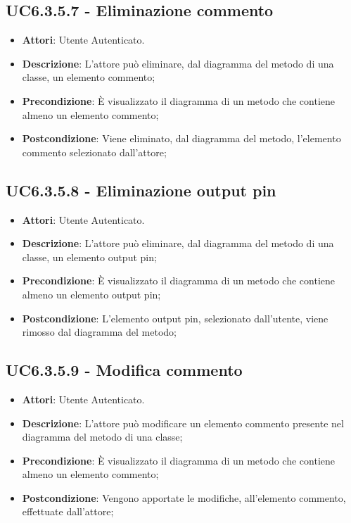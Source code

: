 \subsection{UC6.3.5.7 - Eliminazione commento} 
\label{ssec:UC6.3.5.7} 
\begin{itemize} 
\item \textbf{Attori}: Utente Autenticato.
\item \textbf{Descrizione}: L'attore può eliminare, dal diagramma del metodo di una classe, un elemento commento;
\item \textbf{Precondizione}: È visualizzato il diagramma di un metodo che contiene almeno un elemento commento;
\item \textbf{Postcondizione}: Viene eliminato, dal diagramma del metodo,  l'elemento commento selezionato dall'attore;
\end{itemize} 
\subsection{UC6.3.5.8 - Eliminazione output pin} 
\label{ssec:UC6.3.5.8} 
\begin{itemize} 
\item \textbf{Attori}: Utente Autenticato.
\item \textbf{Descrizione}: L'attore può eliminare, dal diagramma del metodo di una classe, un elemento output pin;
\item \textbf{Precondizione}: È visualizzato il diagramma di un metodo che contiene almeno un elemento output pin;
\item \textbf{Postcondizione}: L'elemento output pin, selezionato dall'utente, viene rimosso dal diagramma del metodo;
\end{itemize} 
\subsection{UC6.3.5.9 - Modifica commento} 
\label{ssec:UC6.3.5.9} 
\begin{itemize} 
\item \textbf{Attori}: Utente Autenticato.
\item \textbf{Descrizione}: L'attore può modificare un elemento commento presente nel diagramma del metodo di una classe;
\item \textbf{Precondizione}: È visualizzato il diagramma di un metodo che contiene almeno un elemento commento;
\item \textbf{Postcondizione}: Vengono apportate le modifiche, all'elemento commento, effettuate dall'attore;
\end{itemize} 
